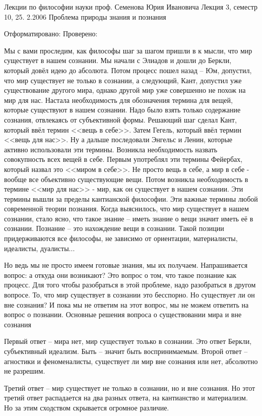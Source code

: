 
Лекции по философии науки проф. Семенова Юрия Ивановича
Лекция 3, семестр 10, 25. 2.2006
Проблема природы знания и познания

Отформатировано: Проверено:

Мы с вами проследим, как философы шаг за шагом пришли в к мысли, что мир существует в нашем сознании. Мы начали с Элиадов и дошли до Беркли, который довёл идею до абсолюта. Потом процесс пошел назад – Юм, допустил, что мир существует не только в сознании, а следующий, Кант, допустил уже существование другого мира, однако другой мир уже совершенно не похож на мир для нас. Настала необходимость для обозначения термина для вещей, которые существуют в нашем сознании. Надо было взять только содержание сознания, отвлекаясь от субъективной формы. Решающий шаг сделал Кант, который ввёл термин <<вещь в себе>>. Затем Гегель, который ввёл термин <<вещь для нас>>. Ну а дальше последовали Энгельс и Ленин, которые активно использовали эти термины. Возникла необходимость назвать совокупность всех вещей в себе. Первым употреблял эти термины Фейербах, который назвал это <<миром в себе>>. Не просто вещь в себе, а мир в себе - вообще все объективно существующие вещи. Потом возникла необходимость в термине <<мир для нас>> - мир, как он существует в нашем сознании. Эти термины вышли за пределы кантианской философии. Эти важные термины любой современной теории познания. Когда выяснилось, что мир существует в нашем сознании, стало ясно, что такое знание – иметь знание о вещи значит иметь её в сознании. Познание – это нахождение вещи в сознании. Такой позиции придерживаются все философы, не зависимо от ориентации, материалисты, идеалисты, дуалисты...

Но ведь мы не просто имеем готовые знания, мы их получаем. Напрашивается вопрос: а откуда они возникают? Это вопрос о том, что такое познание как процесс. Для того чтобы разобраться в этой проблеме, надо разобраться в другом вопросе. То, что мир существует в сознании это бесспорно. Но существует ли он вне сознания? И пока мы не ответим на этот вопрос, мы не можем ответить на вопрос о познании.
Основные решения вопроса о существовании мира и вне сознания

    Первый ответ – мира нет, мир существует только в сознании. Это ответ Беркли, субъективный идеализм. Быть – значит быть воспринимаемым.
    Второй ответ – агностики и феноменалисты, существует ли мир вне сознания или нет, абсолютно не разрешим.

    Третий ответ – мир существует не только в сознании, но и вне сознания. Но этот третий ответ распадается на два разных ответа, на кантианство и материализм. Но за этим сходством скрывается огромное различие.

